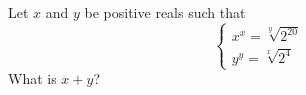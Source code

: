 Let $x$ and $y$ be positive reals such that \[\begin{cases} x^x = \sqrt[y]{2^{20}}\\
y^y = \sqrt[x]{2^4} \end{cases}\]What is $x + y$?
